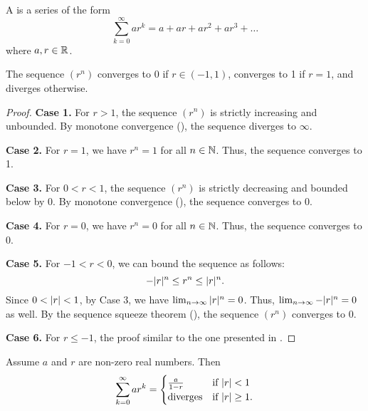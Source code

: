\begin{definition}
  A  is a series of the form
  \[ \sum_{k = 0}^{\infty} ar^k = a + ar + ar^2 + ar^3 + \dots \]
  where $a, r \in \mathbb R$.
\end{definition}

\begin{lemma}
  The sequence $(r^n)$ converges to 0 if $r \in (-1, 1)$, converges
  to 1 if $r = 1$, and diverges otherwise.
\end{lemma}

\begin{proof}
  \phantom{.}

  \textbf{Case 1.} For $r > 1$, the sequence $(r^n)$ is strictly
  increasing and unbounded. By monotone convergence
  (), the sequence diverges to $\infty$.

  \textbf{Case 2.} For $r = 1$, we have $r^n = 1$ for all $n \in
  \mathbb N$. Thus, the sequence converges to 1.

  \textbf{Case 3.} For $0 < r < 1$, the sequence $(r^n)$ is strictly
  decreasing and bounded below by 0. By monotone convergence
  (), the sequence converges to 0.

  \textbf{Case 4.} For $r = 0$, we have $r^n = 0$ for all $n \in
  \mathbb N$. Thus, the sequence converges to 0.

  \textbf{Case 5.} For $-1 < r < 0$, we can bound the sequence as follows:
  \[ -| r |^n \leq r^n \leq | r |^n. \]
  Since $0 < | r | < 1$, by Case 3, we have $\lim_{n \to
  \infty} | r |^n = 0$. Thus, $\lim_{n \to \infty} -| r |^n =
  0$ as well. By the sequence squeeze theorem
  (), the sequence $(r^n)$ converges to 0.

  \textbf{Case 6.} For $r \leq -1$, the proof similar to the one
  presented in .
\end{proof}

\begin{proposition}
  Assume $a$ and $r$ are non-zero real numbers. Then
  \begin{align*}
    \sum_{k = 0}^{\infty} ar^k =
    \begin{cases}
      \frac{a}{1 - r} & \text{if $| r | < 1$} \\
      \text{diverges} & \text{if $| r | \geq 1$}.
    \end{cases}
  \end{align*}
\end{proposition}

